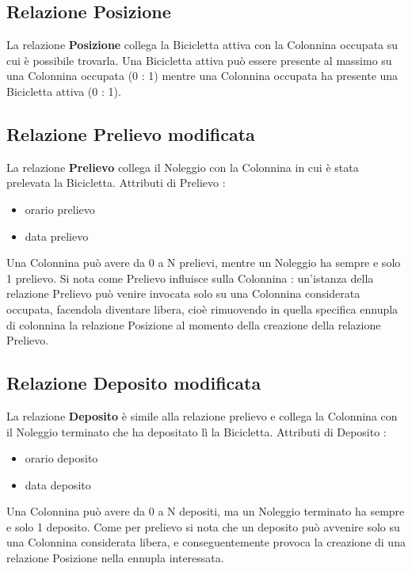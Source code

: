 \documentclass[a4paper,twoside]{article}
\begin{document}
\subsection{Relazione Posizione}
La relazione \textbf{Posizione} collega la Bicicletta attiva con la Colonnina occupata su cui è possibile trovarla.\newline
Una Bicicletta attiva può essere presente al massimo su una Colonnina occupata (0 : 1) mentre una Colonnina occupata ha presente una Bicicletta attiva (0 : 1).

\subsection{Relazione Prelievo modificata}
La relazione \textbf{Prelievo} collega il Noleggio con la Colonnina in cui è stata prelevata la Bicicletta.\newline
Attributi di Prelievo :
\begin{itemize}
 \item orario prelievo
 \item data prelievo
\end{itemize}
Una Colonnina può avere da 0 a N prelievi, mentre un Noleggio ha sempre e solo 1 prelievo.\newline
Si nota come Prelievo influisce sulla Colonnina : un'istanza della relazione Prelievo può venire invocata solo su una Colonnina considerata occupata, facendola diventare libera, cioè rimuovendo in quella specifica ennupla di colonnina la relazione Posizione al momento della creazione della relazione Prelievo.

\subsection{Relazione Deposito modificata}
La relazione \textbf{Deposito} è simile alla relazione prelievo e collega la Colonnina con il Noleggio terminato che ha depositato lì la Bicicletta.\newline
Attributi di Deposito :
\begin{itemize}
 \item orario deposito
 \item data deposito
\end{itemize}
Una Colonnina può avere da 0 a N depositi, ma un Noleggio terminato ha sempre e solo 1 deposito.\newline
Come per prelievo si nota che un deposito può avvenire solo su una Colonnina considerata libera, e conseguentemente provoca la creazione di una relazione Posizione nella ennupla interessata.
\end{document}
